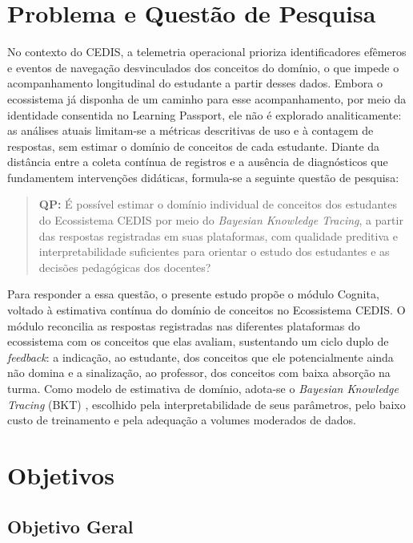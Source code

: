 \section{Problema e Questão de Pesquisa}
\label{sec:problema}

No contexto do CEDIS, a telemetria operacional prioriza identificadores efêmeros e eventos de navegação desvinculados dos conceitos do domínio, o que impede o acompanhamento longitudinal do estudante a partir desses dados. Embora o ecossistema já disponha de um caminho para esse acompanhamento, por meio da identidade consentida no Learning Passport, ele não é explorado analiticamente: as análises atuais limitam-se a métricas descritivas de uso e à contagem de respostas, sem estimar o domínio de conceitos de cada estudante. Diante da distância entre a coleta contínua de registros e a ausência de diagnósticos que fundamentem intervenções didáticas, formula-se a seguinte questão de pesquisa:

\begin{quote}
\textbf{QP:} É possível estimar o domínio individual de conceitos dos estudantes do Ecossistema CEDIS por meio do \textit{Bayesian Knowledge Tracing}, a partir das respostas registradas em suas plataformas, com qualidade preditiva e interpretabilidade suficientes para orientar o estudo dos estudantes e as decisões pedagógicas dos docentes?
\end{quote}

Para responder a essa questão, o presente estudo propõe o módulo Cognita, voltado à estimativa contínua do domínio de conceitos no Ecossistema CEDIS. O módulo reconcilia as respostas registradas nas diferentes plataformas do ecossistema com os conceitos que elas avaliam, sustentando um ciclo duplo de \textit{feedback}: a indicação, ao estudante, dos conceitos que ele potencialmente ainda não domina e a sinalização, ao professor, dos conceitos com baixa absorção na turma. Como modelo de estimativa de domínio, adota-se o \textit{Bayesian Knowledge Tracing} (BKT) \cite{corbett_knowledge_1994}, escolhido pela interpretabilidade de seus parâmetros, pelo baixo custo de treinamento e pela adequação a volumes moderados de dados.

\section{Objetivos}
\label{sec:objetivos}

\subsection{Objetivo Geral}
\label{subsec:objetivo-geral}

